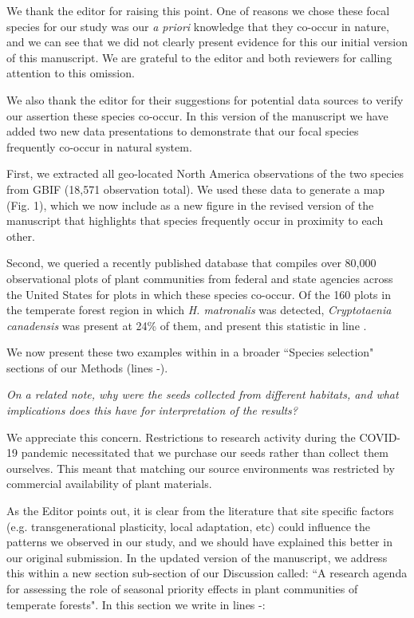 \documentclass[11pt]{article}
\begin{document}
We thank the editor for raising this point. One of reasons we chose these focal species for our study was our \emph{a priori} knowledge that they co-occur in nature, and we can see that we did not clearly present evidence for this our initial version of this manuscript. We are grateful to the editor and both reviewers for calling attention to this omission.

We also thank the editor for their suggestions for potential data sources to verify our assertion these species co-occur. In this version of the manuscript we have added two new data presentations to demonstrate that our focal species frequently co-occur in natural system. 

First, we extracted all geo-located North America observations of the two species from GBIF (18,571 observation total). We used these data to generate a map (Fig. 1), which we now include as a new figure in the revised version of the manuscript that highlights that species frequently occur in proximity to each other.

Second, we queried a recently published database that compiles over 80,000 observational plots of plant communities from federal and state agencies across the United States for plots in which these species co-occur. Of the 160 plots in the temperate forest region in which \emph{H. matronalis} was detected, \emph{Cryptotaenia canadensis} was present at 24\% of them, and present this statistic in line .

We now present these two examples within in a broader ``Species selection" sections of our Methods (lines -).


\emph{On a related note, why were the seeds collected from different habitats, and what implications does this have for interpretation of the results?}

We appreciate this concern. Restrictions to research activity during the COVID-19 pandemic necessitated that we purchase our seeds rather than collect them ourselves. This meant that matching our source environments was restricted by commercial availability of plant materials. 

As the Editor points out, it is clear from the literature that site specific factors (e.g.  transgenerational plasticity, local adaptation, etc) could influence the patterns we observed in our study, and we should have explained this better in our original submission. In the updated version of the manuscript, we address this within a new section sub-section of our Discussion called: ``A research agenda for assessing the role of seasonal priority effects in plant communities of temperate forests". In this section we write in lines -:
\end{document}
